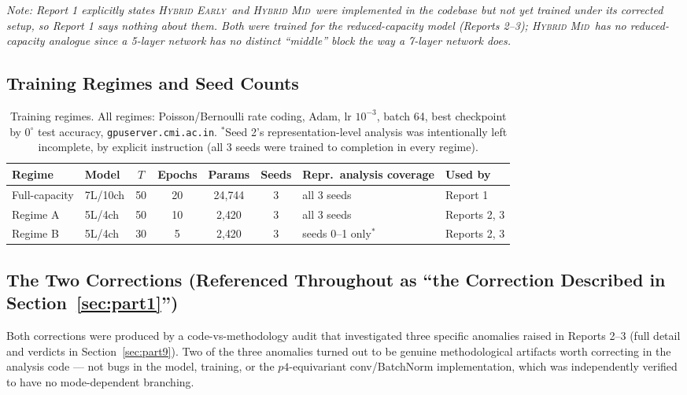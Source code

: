 \documentclass[11pt]{article}
\newcommand{\HybridEarly}{\textsc{Hybrid Early}}
\newcommand{\HybridMid}{\textsc{Hybrid Mid}}
\begin{document}
\noindent\textit{Note: Report 1 explicitly states \HybridEarly\ and \HybridMid\ were implemented in the
codebase but not yet trained under its corrected setup, so Report 1 says nothing about them. Both were
trained for the reduced-capacity model (Reports 2--3); \HybridMid\ has no reduced-capacity analogue
since a 5-layer network has no distinct ``middle'' block the way a 7-layer network does.}

\subsection{Training Regimes and Seed Counts}

\begin{table}[H]
\centering
\small
\begin{tabular}{@{}llccccp{4.1cm}l@{}}
\toprule
\textbf{Regime} & \textbf{Model} & $T$ & \textbf{Epochs} & \textbf{Params} & \textbf{Seeds} & \textbf{Repr.\ analysis coverage} & \textbf{Used by} \\
\midrule
Full-capacity & 7L/10ch & 50 & 20 & 24{,}744 & 3 & all 3 seeds & Report 1 \\
Regime A & 5L/4ch & 50 & 10 & 2{,}420 & 3 & all 3 seeds & Reports 2, 3 \\
Regime B & 5L/4ch & 30 & 5 & 2{,}420 & 3 & seeds 0--1 only$^{*}$ & Reports 2, 3 \\
\bottomrule
\end{tabular}
\caption{Training regimes. All regimes: Poisson/Bernoulli rate coding, Adam, lr $10^{-3}$, batch 64,
best checkpoint by $0^\circ$ test accuracy, \texttt{gpuserver.cmi.ac.in}. $^{*}$Seed 2's
representation-level analysis was intentionally left incomplete, by explicit instruction (all 3 seeds
were trained to completion in every regime).}
\end{table}

\subsection{The Two Corrections (Referenced Throughout as ``the Correction Described in Section~\ref{sec:part1}'')}
\label{sec:corrections}

Both corrections were produced by a code-vs-methodology audit that investigated three specific
anomalies raised in Reports 2--3 (full detail and verdicts in Section~\ref{sec:part9}). Two of the three
anomalies turned out to be genuine methodological artifacts worth correcting in the analysis code ---
not bugs in the model, training, or the $p4$-equivariant conv/BatchNorm implementation, which was
independently verified to have no mode-dependent branching.
\end{document}
